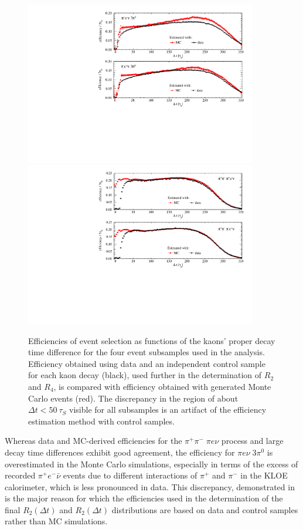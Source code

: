 \begin{figure}[h!]
  \centering
  \includegraphics[width=0.9\textwidth]{Chapter7_analysis_kloe/img/common/efficiencies_t1}  
  \includegraphics[width=0.9\textwidth]{Chapter7_analysis_kloe/img/common/efficiencies_t2}  
  \caption{Efficiencies of event selection as functions of the kaons' proper decay time difference for the four event subsamples used in the analysis. Efficiency obtained using data and an independent control sample for each kaon decay (black), used further in the determination of $R_2$ and $R_4$, is compared with efficiency obtained with generated Monte Carlo events (red). The discrepancy in the region of about $\Delta t < 50\ \tau_{S} $ visible for all subsamples is an artifact of the efficiency estimation method with control samples.}\label{fig:eff_comparison}
\end{figure}

Whereas data and MC-derived efficiencies for the $\pi^+\pi^-\;\pi e\nu$ process and large decay time differences exhibit good agreement, the efficiency for $\pi e \nu\;3\pi^0$ is overestimated in the Monte Carlo simulations, especially in terms of the excess of recorded $\pi^+e^-\bar{\nu}$ events due to different interactions of $\pi^+$ and $\pi^-$ in the KLOE calorimeter, which is less pronounced in data. This discrepancy, demonstrated in~ is the major reason for which the efficiencies used in the determination of the final $R_2(\Delta t)$ and $R_2(\Delta t)$ distributions are based on data and control samples rather than MC simulations.

